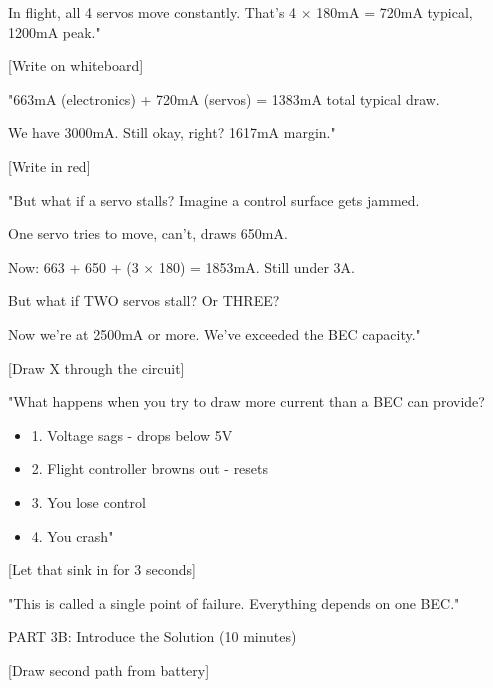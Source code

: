 \documentclass[11pt,letterpaper]{article}
\begin{document}
{In flight, all 4 servos move constantly. That's 4 $\times$ 180mA = 720mA typical, 1200mA peak."\par

[Write on whiteboard]\par

"663mA (electronics) + 720mA (servos) = 1383mA total typical draw.\par

We have 3000mA. Still okay, right? 1617mA margin."\par

[Write in red]\par

"But what if a servo stalls? Imagine a control surface gets jammed.\par

One servo tries to move, can't, draws 650mA.\par

Now: 663 + 650 + (3 $\times$ 180) = 1853mA. Still under 3A.\par

But what if TWO servos stall? Or THREE?\par

Now we're at 2500mA or more. We've exceeded the BEC capacity."\par

[Draw X through the circuit]\par

"What happens when you try to draw more current than a BEC can provide?\par

\begin{itemize}
  \item 1. Voltage sags - drops below 5V
  \item 2. Flight controller browns out - resets
  \item 3. You lose control
  \item 4. You crash"
\end{itemize}

[Let that sink in for 3 seconds]\par

"This is called a single point of failure. Everything depends on one BEC."\par

PART 3B: Introduce the Solution (10 minutes)\par

[Draw second path from battery]\par

}
\end{document}
